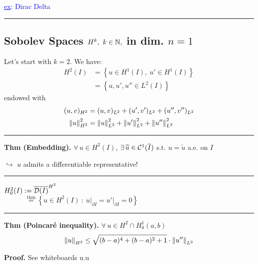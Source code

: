 \smallskip

\textcolor{blue}{\underline{ex}: Dirac Delta}

\rule{0.31\textwidth}{0.2pt}


\subsection{\color{red}Sobolev Spaces \texorpdfstring{$H^k,\ k\in\mathbb{N},$}{C} in dim. \texorpdfstring{$n=1$}{C}}


Let's start with $k=2$. We have:
\begin{align*}
H^2(I)&=\left\{ u\in H^1(I),\ u'\in H^1(I) \right\}\\&=\left\{ u,u',u''\in L^2(I) \right\}
\end{align*}
endowed with
\begin{align*}
(u,v)_{H^2}&=(u,v)_{L^2}+(u',v')_{L^2}+(u'',v'')_{L^2} \\
\left\lVert u \right\rVert^2_{H^2}&=\left\lVert u \right\rVert_{L^2}^2+\left\lVert u' \right\rVert_{L^2}^2+\left\lVert u'' \right\rVert_{L^2}^2
\end{align*}

\rule{0.31\textwidth}{0.2pt}
\smallskip

\textbf{Thm (Embedding).} $\forall\,u\in H^2(I)$, $\exists\,\widetilde{u}\in\mathcal{C}^1(\overline{I})$ s.t. $u=\widetilde{u}$ a.e. on $I$

\smallskip

$\hookrightarrow$ $u$ admits a differentiable representative!

\rule{0.31\textwidth}{0.2pt}

\newcolumn 

$
H^2_0(I):=\overline{\mathcal{D}(I)}^{H^2}
$ \\
$\qquad\quad\overset{\text{thm}}{=}\left\{ u\in H^2(I)\ :\ u\big|_{\partial I}=u'\big|_{\partial I}=0 \right\}
$

\rule{0.31\textwidth}{0.2pt}
\smallskip

\textbf{Thm (Poincaré inequality).} $\forall\, u\in H^2\cap H^1_0(a,b)$
\begin{equation*}
\left\lVert u \right\rVert_{H^2}\leq \sqrt{(b-a)^4+(b-a)^2+1}\cdot \left\lVert u'' \right\rVert_{L^2}
\end{equation*}

\textbf{\color{lavender(floral)}Proof.} See whiteboards u.u

\smallskip


